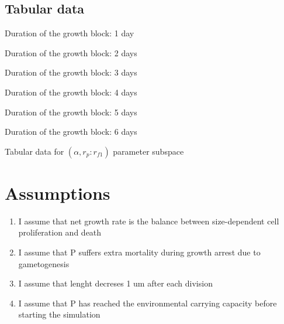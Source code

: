 \documentclass[a4paper,oneside]{book}
\begin{document}
    \subsection*{Tabular data}
        \begin{table}[h]
          \begin{subtable}[h]{0.45\textwidth}
            \centering
            
            \caption{Duration of the growth block: 1 day}
          \end{subtable}
          \begin{subtable}[h]{0.45\textwidth}
            \centering
            
            \caption{Duration of the growth block: 2 days}
          \end{subtable}

          \vspace{1cm}
          \begin{subtable}[h]{0.45\textwidth}
            \centering
            
            \caption{Duration of the growth block: 3 days}
          \end{subtable}
          \begin{subtable}[h]{0.45\textwidth}
            \centering
            
            \caption{Duration of the growth block: 4 days}
          \end{subtable}

          \vspace{1cm}
          \begin{subtable}[h]{0.45\textwidth}
            \centering
            
            \caption{Duration of the growth block: 5 days}
          \end{subtable}
          \begin{subtable}[h]{0.45\textwidth}
            \centering
            
            \caption{Duration of the growth block: 6 days}
          \end{subtable}
           \caption{Tabular data for $(\alpha, r_p:r_{f1})$ parameter subspace}\label{tbl2}
        \end{table}
  \section*{Assumptions} 
    \begin{enumerate}
      \item I assume that net growth rate is the balance between size-dependent cell proliferation and death
      \item I assume that P suffers extra mortality during growth arrest due to gametogenesis
      \item I assume that lenght decreses 1 um after each division
      \item I assume that P has reached the environmental carrying capacity before starting the simulation
    \end{enumerate}
\end{document}
